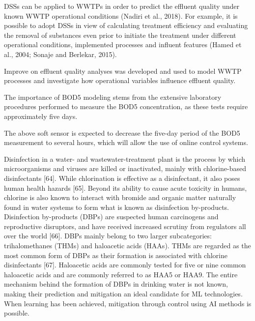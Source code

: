 DSSs can be applied to WWTPs in order to predict the effluent quality under known WWTP operational conditions (Nadiri et al., 2018). For example, it is possible to adopt DSSs in view of calculating treatment efficiency and evaluating the removal of substances even prior to initiate the treatment under different operational conditions, implemented processes and influent features (Hamed et al., 2004; Sonaje and Berlekar, 2015).

Improve on effluent quality 
analyses was developed and used to model WWTP processes and investigate how operational variables influence effluent quality.



The importance of BOD5 modeling stems from the extensive laboratory procedures performed to measure the BOD5 concentration, as these tests require approximately five days. 

The above soft sensor is expected to decrease the five-day period of the BOD5 measurement to several hours, which will allow the use of online control systems. \citep{alsulailiArtificialNeuralNetwork2021}


Disinfection in a water- and wastewater-treatment plant is the process by which microorganisms and viruses are killed or inactivated, mainly with chlorine-based disinfectants [64]. While chlorination is effective as a disinfectant, it also poses human health hazards [65]. Beyond its ability to cause acute toxicity in humans, chlorine is also known to interact with bromide and organic matter naturally found in water systems to form what is known as disinfection by-products. Disinfection by-products (DBPs) are suspected human carcinogens and reproductive disruptors, and have received increased scrutiny from regulators all over the world [66]. DBPs mainly belong to two larger subcategories: trihalomethanes (THMs) and haloacetic acids (HAAs). THMs are regarded as the most common form of DBPs as their formation is associated with chlorine disinfectants [67]. Haloacetic acids are commonly tested for five or nine common haloacetic acids and are commonly referred to as HAA5 or HAA9. The entire mechanism behind the formation of DBPs in drinking water is not known, making their prediction and mitigation an ideal candidate for ML technologies. When learning has been achieved, mitigation through control using AI methods is possible.




